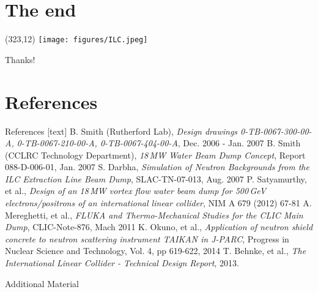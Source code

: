 \documentclass[xcolor={dvipsnames}]{beamer}
\newcommand{\ilclogo}{
  \setlength{\TPHorizModule}{1pt}
  \setlength{\TPVertModule}{1pt}
  \begin{textblock}{1}(323,12)
   \texttt{[image: figures/ILC.jpeg]}
  \end{textblock}
}
\begin{document}
\section*{The end}
{
\begin{frame}
\ilclogo
\begin{center}
\textcolor{RubineRed}{
	\LARGE Thanks!\\
}
\end{center}
\end{frame}
}

\section*{References}
\begin{thebibliography}{9}
\begin{frame}{References}
[text]
 B. Smith (Rutherford Lab), \emph{Design drawings 0-TB-0067-300-00-A, 0-TB-0067-210-00-A, 0-TB-0067-404-00-A}, Dec. 2006 - Jan. 2007
 B. Smith (CCLRC Technology Department), \emph{18\,MW Water Beam Dump Concept}, Report 088-D-006-01, Jan. 2007
 S. Darbha, \emph{Simulation of Neutron Backgrounds from the ILC Extraction Line Beam Dump}, SLAC-TN-07-013, Aug. 2007
 P. Satyamurthy, et al., \emph{Design of an 18\,MW vortex flow water beam dump for 500\,GeV electrons/positrons of an international linear collider}, NIM A 679 (2012) 67-81
 A. Mereghetti, et al., \emph{FLUKA and Thermo-Mechanical Studies for the CLIC Main Dump}, CLIC-Note-876, Mach 2011
 K. Okuno, et al., \emph{Application of neutron shield concrete to neutron scattering instrument TAIKAN in J-PARC}, Progress in Nuclear Science and Technology, Vol. 4, pp 619-622, 2014
 T. Behnke, et al., \emph{The International Linear Collider - Technical Design Report}, 2013.
\end{frame}
\end{thebibliography}

\appendix

\begin{frame}
\begin{center}
\LARGE Additional Material
\end{center}
  \tableofcontents
\end{frame}
\end{document}
